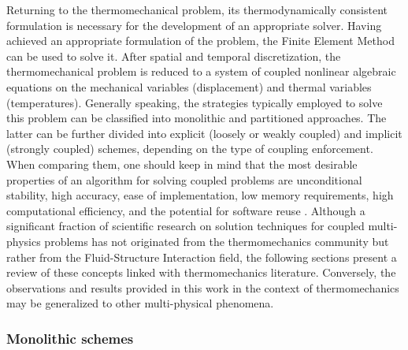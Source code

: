 Returning to the thermomechanical problem, its thermodynamically consistent formulation is necessary for the development of an appropriate solver.
Having achieved an appropriate formulation of the problem, the Finite Element Method can be used to solve it.
After spatial and temporal discretization, the thermomechanical problem is reduced to a system of coupled nonlinear algebraic equations on the mechanical variables (displacement) and thermal variables (temperatures).
Generally speaking, the strategies typically employed to solve this problem can be classified into monolithic and partitioned approaches.
The latter can be further divided into explicit (loosely or weakly coupled) and implicit (strongly coupled) schemes, depending on the type of coupling enforcement.
When comparing them, one should keep in mind that the most desirable properties of an algorithm for solving coupled problems are unconditional stability, high accuracy, ease of implementation, low memory requirements, high computational efficiency, and the potential for software reuse \citep{fellipa_partitioned_1988}.
Although a significant fraction of scientific research on solution techniques for coupled multi-physics problems has not originated from the thermomechanics community but rather from the Fluid-Structure Interaction field, the following sections present a review of these concepts linked with thermomechanics literature.
Conversely, the observations and results provided in this work in the context of thermomechanics may be generalized to other multi-physical phenomena.

\subsubsection{Monolithic schemes}
\label{sec:monolithic-schemes}

